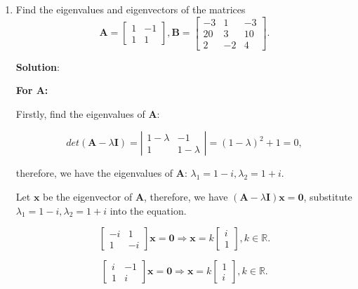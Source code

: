 \documentclass[12pt, a4paper, UTF8]{ctexart}
\begin{document}
	\begin{enumerate}
		\item
		Find the eigenvalues and eigenvectors of the matrices
		$$\bm{A}=
			\begin{bmatrix}
			1 & -1 \\
			1 & 1 
			\end{bmatrix}
		,
		\bm{B}=
			\begin{bmatrix}
			-3 & 1 & -3 \\
			20 & 3 & 10 \\
			2 & -2 & 4 
			\end{bmatrix}.
		$$

		\textbf{Solution}:
		
		\textbf{For $\bm{A}$:}

		Firstly, find the eigenvalues of $\bm{A}$:

		\begin{equation*}
			det(\bm{A}-\lambda\bm{I})=
			\left|\begin{matrix}
			1-\lambda & -1 \\
			1 & 1-\lambda
			\end{matrix}\right|=(1-\lambda)^2+1=0,
		\end{equation*}

		therefore, we have the eigenvalues of $\bm{A}$: $\lambda_1=1-i,\lambda_2=1+i$.

		Let $\bm{x}$ be the eigenvector of $\bm{A}$, therefore, we have $(\bm{A}-\lambda\bm{I})\bm{x}=\bm{0}$, substitute $\lambda_1=1-i,\lambda_2=1+i$ into the equation.

		\begin{equation*}
			\begin{bmatrix}
				-i & 1 \\
				1 & -i
			\end{bmatrix}\bm{x} = \bm{0} \Longrightarrow \bm{x} = k \begin{bmatrix}
				i \\ 1
			\end{bmatrix}, k \in \mathbb{R}.
		\end{equation*}

		\begin{equation*}
			\begin{bmatrix}
				i & -1 \\ 1 & i
			\end{bmatrix}\bm{x} = \bm{0} \Longrightarrow \bm{x} = k \begin{bmatrix}
				1 \\ i
			\end{bmatrix}, k \in \mathbb{R}.
		\end{equation*}
		

\end{enumerate}
\end{document}
